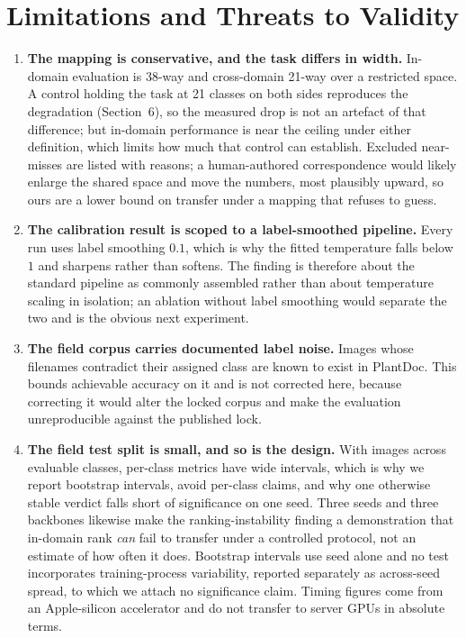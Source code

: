 \documentclass[runningheads]{llncs}
\begin{document}
\section{Limitations and Threats to Validity}
\label{sec:limitations}

\begin{enumerate}
\item \textbf{The mapping is conservative, and the task differs in width.}
In-domain evaluation is 38-way and cross-domain 21-way over a restricted space.
A control holding the task at 21 classes on both sides reproduces the
degradation (Section~6), so the measured drop is not an artefact of that
difference; but in-domain performance is near the ceiling under either
definition, which limits how much that control can establish. Excluded
near-misses are listed with reasons; a human-authored correspondence would
likely enlarge the shared space and move the numbers, most plausibly upward, so
ours are a lower bound on transfer under a mapping that refuses to guess.

\item \textbf{The calibration result is scoped to a label-smoothed pipeline.}
Every run uses label smoothing $0.1$, which is why the fitted temperature falls
below $1$ and sharpens rather than softens. The finding is therefore about the
standard pipeline as commonly assembled rather than about temperature scaling in
isolation; an ablation without label smoothing would separate the two and is the
obvious next experiment.

\item \textbf{The field corpus carries documented label noise.} Images whose
filenames contradict their assigned class are known to exist in PlantDoc. This
bounds achievable accuracy on it and is not corrected here, because correcting
it would alter the locked corpus and make the evaluation unreproducible against
the published lock.

\item \textbf{The field test split is small, and so is the design.} With
\NPdcTest{} images across \NPdcTestClasses{} evaluable classes, per-class metrics
have wide intervals, which is why we report bootstrap intervals, avoid per-class
claims, and why one otherwise stable verdict falls short of significance on one
seed. Three seeds and three backbones likewise make the ranking-instability
finding a demonstration that in-domain rank \emph{can} fail to transfer under a
controlled protocol, not an estimate of how often it does. Bootstrap intervals
use seed \SigSeed{} alone and no test incorporates training-process variability,
reported separately as across-seed spread, to which we attach no significance
claim. Timing figures come from an Apple-silicon accelerator and do not transfer
to server GPUs in absolute terms.


\end{enumerate}
\end{document}
